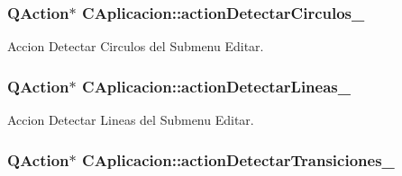 \subsubsection[{\texorpdfstring{action\+Detectar\+Circulos\+\_\+}{actionDetectarCirculos_}}]{\setlength{\rightskip}{0pt plus 5cm}Q\+Action$\ast$ C\+Aplicacion\+::action\+Detectar\+Circulos\+\_\+\hspace{0.3cm}{\ttfamily [private]}}\hypertarget{classCAplicacion_ab4c2fb6ecc5d7c21a1f181f0f0af2830}{}\label{classCAplicacion_ab4c2fb6ecc5d7c21a1f181f0f0af2830}


Accion Detectar Circulos del Submenu Editar. 

\subsubsection[{\texorpdfstring{action\+Detectar\+Lineas\+\_\+}{actionDetectarLineas_}}]{\setlength{\rightskip}{0pt plus 5cm}Q\+Action$\ast$ C\+Aplicacion\+::action\+Detectar\+Lineas\+\_\+\hspace{0.3cm}{\ttfamily [private]}}\hypertarget{classCAplicacion_a5b6d0af534cc0f64dfb7598faa30f3ae}{}\label{classCAplicacion_a5b6d0af534cc0f64dfb7598faa30f3ae}


Accion Detectar Lineas del Submenu Editar. 

\subsubsection[{\texorpdfstring{action\+Detectar\+Transiciones\+\_\+}{actionDetectarTransiciones_}}]{\setlength{\rightskip}{0pt plus 5cm}Q\+Action$\ast$ C\+Aplicacion\+::action\+Detectar\+Transiciones\+\_\+\hspace{0.3cm}{\ttfamily [private]}}\hypertarget{classCAplicacion_acda82e41d91a94e32bbfa21965338f5a}{}\label{classCAplicacion_acda82e41d91a94e32bbfa21965338f5a}



